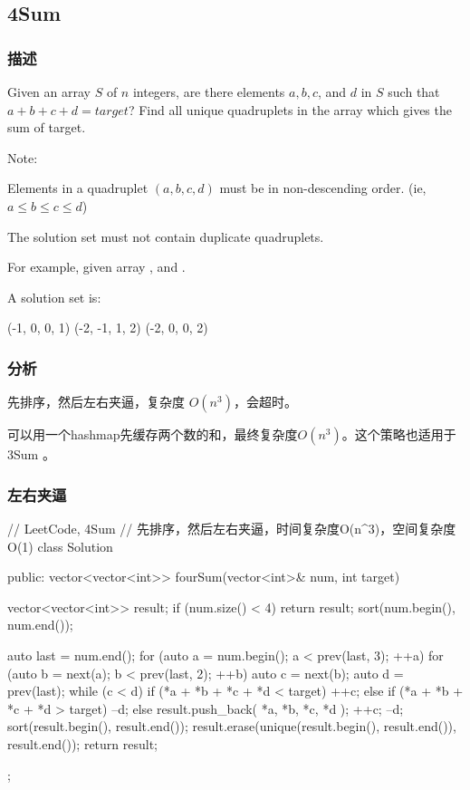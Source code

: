 \subsection{4Sum} %
\label{sec:4sum}


\subsubsection{描述}
Given an array $S$ of $n$ integers, are there elements $a, b, c$, and $d$ in $S$ such that $a + b + c + d = target$? Find all unique quadruplets in the array which gives the sum of target.

Note:
\begindot
\item Elements in a quadruplet $(a,b,c,d)$ must be in non-descending order. (ie, $a \leq b \leq c \leq d$)
\item The solution set must not contain duplicate quadruplets.
\myenddot

For example, given array , and . 

A solution set is:
\begin{Code}
(-1,  0, 0, 1)
(-2, -1, 1, 2)
(-2,  0, 0, 2)
\end{Code}


\subsubsection{分析}
先排序，然后左右夹逼，复杂度 $O(n^3)$，会超时。

可以用一个hashmap先缓存两个数的和，最终复杂度$O(n^3)$。这个策略也适用于 3Sum 。


\subsubsection{左右夹逼}
\begin{Code}
// LeetCode, 4Sum
// 先排序，然后左右夹逼，时间复杂度O(n^3)，空间复杂度O(1)
class Solution {
public:
    vector<vector<int>> fourSum(vector<int>& num, int target) {
        vector<vector<int>> result;
        if (num.size() < 4) return result;
        sort(num.begin(), num.end());

        auto last = num.end();
        for (auto a = num.begin(); a < prev(last, 3); ++a) {
            for (auto b = next(a); b < prev(last, 2); ++b) {
                auto c = next(b);
                auto d = prev(last);
                while (c < d) {
                    if (*a + *b + *c + *d < target) {
                        ++c;
                    } else if (*a + *b + *c + *d > target) {
                        --d;
                    } else {
                        result.push_back({ *a, *b, *c, *d });
                        ++c;
                        --d;
                    }
                }
            }
        }
        sort(result.begin(), result.end());
        result.erase(unique(result.begin(), result.end()), result.end());
        return result;
    }
};
\end{Code}


